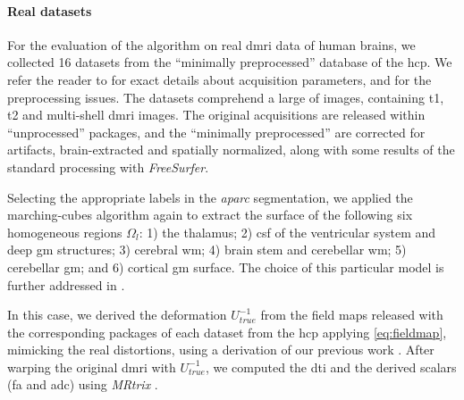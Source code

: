 \paragraph*{Real datasets} %
\label{sec:human_connectome}
%
For the evaluation of the algorithm on real \gls*{dmri} data of human brains,
  we collected 16 datasets from the ``minimally preprocessed''
	 database of the \gls*{hcp}.
We refer the reader to \citep{essen_human_2012} for exact details about acquisition
  parameters, and \citep{glasser_minimal_2013} for the preprocessing issues.
The datasets comprehend a large of images, containing \gls*{t1}, \gls*{t2} and
  multi-shell \gls*{dmri} images.
The original acquisitions are released within ``unprocessed'' packages, and
  the ``minimally preprocessed'' are corrected for artifacts, brain-extracted
  and spatially normalized, along with some results of the standard processing with
  \emph{FreeSurfer}.

Selecting the appropriate labels in the \emph{aparc} segmentation, we applied
  the marching-cubes algorithm again to extract the surface of the following
  six homogeneous regions $\Omega_l$:
  1) the thalamus;
  2) \gls*{csf} of the ventricular system and deep \gls*{gm} structures;
  3) cerebral \gls*{wm};
  4) brain stem and cerebellar \gls*{wm};
	5) cerebellar \gls*{gm}; and
	6) cortical \gls*{gm} surface.
The choice of this particular model is further addressed in .

In this case, we derived the deformation $U_{true}^{-1}$ from the field maps released with
  the corresponding packages of each dataset from the \gls*{hcp} applying \eqref{eq:fieldmap},
  mimicking the real distortions, using a derivation of our previous work
  \citep{esteban_simulationbased_2014}.
After warping the original \gls*{dmri} with $U_{true}^{-1}$, we computed the \gls*{dti} and
  the derived scalars (\gls*{fa} and \gls*{adc}) using \emph{MRtrix} \citep{tournier_mrtrix_2012}.
